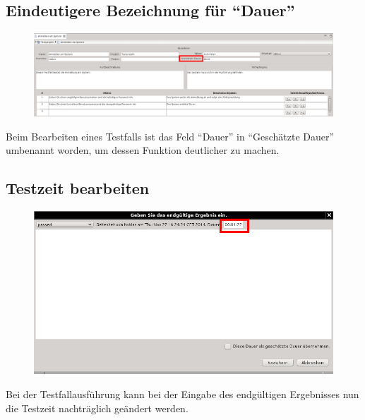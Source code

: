 \documentclass[11pt,a4paper,titlepage]{article}
\begin{document}
\subsection{Eindeutigere Bezeichnung für "`Dauer"'}
\begin{figure}[H]
 \centering
 \includegraphics[scale=0.6]{./BilderAenderungen/testfall-bearbeiten-dauer-neu.png}
\end{figure}
Beim Bearbeiten eines Testfalls ist das Feld "`Dauer"' in "`Geschätzte Dauer"' umbenannt worden, um dessen Funktion deutlicher zu machen.

\subsection{Testzeit bearbeiten}
 \begin{figure}[H]
 \centering
 \includegraphics[width=\textwidth]{./BilderAenderungen/endgueltiges-ergebnis-zeit-bearbeitbar-neu.png}
\end{figure}
Bei der Testfallausführung kann bei der Eingabe des endgültigen Ergebnisses nun die Testzeit nachträglich geändert werden.
\end{document}
